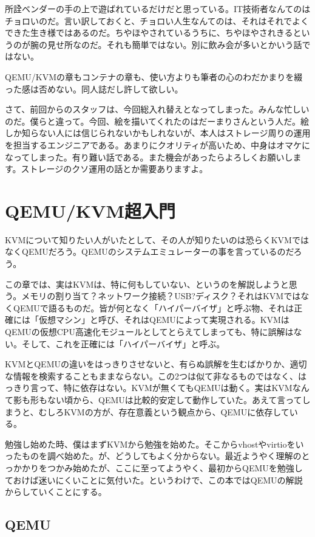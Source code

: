 ﻿\documentclass[9pt,b5paper,tombo,openany]{jsbook}
\begin{document}
所詮ベンダーの手の上で遊ばれているだけだと思っている。IT技術者なんてのはチョロいのだ。言い訳しておくと、チョロい人生なんてのは、それはそれでよくできた生き様ではあるのだ。ちやほやされているうちに、ちやほやされきるというのが腕の見せ所なのだ。それも簡単ではない。別に飲み会が多いとかいう話ではない。

QEMU/KVMの章もコンテナの章も、使い方よりも筆者の心のわだかまりを綴った感は否めない。同人誌だし許して欲しい。

さて、前回からのスタッフは、今回総入れ替えとなってしまった。みんな忙しいのだ。僕らと違って。今回、絵を描いてくれたのはだーまりさんという人だ。絵しか知らない人には信じられないかもしれないが、本人はストレージ周りの運用を担当するエンジニアである。あまりにクオリティが高いため、中身はオマケになってしまった。有り難い話である。また機会があったらよろしくお願いします。ストレージのクソ運用の話とか需要ありますよ。

\chapter{QEMU/KVM超入門}

KVMについて知りたい人がいたとして、その人が知りたいのは恐らくKVMではなくQEMUだろう。QEMUのシステムエミュレーターの事を言っているのだろう。

この章では、実はKVMは、特に何もしていない、というのを解説しようと思う。メモリの割り当て？ネットワーク接続？USB?ディスク？それはKVMではなくQEMUで語るものだ。皆が何となく「ハイパーバイザ」と呼ぶ物、それは正確には「仮想マシン」と呼び、それはQEMUによって実現される。KVMはQEMUの仮想CPU高速化モジュールとしてとらえてしまっても、特に誤解はない。そして、これを正確には「ハイパーバイザ」と呼ぶ。

KVMとQEMUの違いをはっきりさせないと、有らぬ誤解を生むばかりか、適切な情報を検索することもままならない。この2つは似て非なるものではなく、はっきり言って、特に依存はない。KVMが無くてもQEMUは動く。実はKVMなんて影も形もない頃から、QEMUは比較的安定して動作していた。あえて言ってしまうと、むしろKVMの方が、存在意義という観点から、QEMUに依存している。

勉強し始めた時、僕はまずKVMから勉強を始めた。そこからvhostやvirtioをいったものを調べ始めた。が、どうしてもよく分からない。最近ようやく理解のとっかかりをつかみ始めたが、ここに至ってようやく、最初からQEMUを勉強しておけば迷いにくいことに気付いた。というわけで、この本ではQEMUの解説からしていくことにする。

\section{QEMU}
\end{document}
